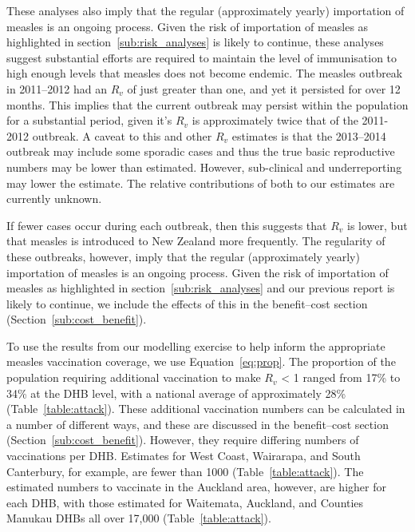 \documentclass{article}
\begin{document}
\begin{itemize}
These analyses also imply that the regular (approximately yearly) importation of measles is an ongoing process. Given the risk of importation of measles as highlighted in section~\ref{sub:risk_analyses} is likely to continue, these analyses suggest substantial efforts are required to maintain the level of immunisation to high enough levels that measles does not become endemic. The measles outbreak in 2011--2012 had an $R_v$ of just greater than one, and yet it persisted for over 12 months. This implies that the current outbreak may persist within the population for a substantial period, given it's $R_v$ is approximately twice that of the 2011-2012 outbreak. A caveat to this and other $R_v$ estimates is that the 2013--2014 outbreak may include some sporadic cases and thus the true basic reproductive numbers may be lower than estimated. However, sub-clinical and underreporting may lower the estimate. The relative contributions of both to our estimates are currently unknown. 

If fewer cases occur during each outbreak, then this suggests that $R_v$ is lower, but that measles is introduced to New Zealand more frequently. The regularity of these outbreaks, however, imply that the regular (approximately yearly) importation of measles is an ongoing process. Given the risk of importation of measles as highlighted in section~\ref{sub:risk_analyses} and our previous report is likely to continue, we include the effects of this in the benefit--cost section (Section~\ref{sub:cost_benefit}).

To use the results from our modelling exercise to help inform the appropriate measles vaccination coverage, we use Equation~\ref{eq:prop}. The proportion of the population requiring additional vaccination to make $R_v$ < 1 ranged from 17\% to 34\% at the DHB level, with a national average of approximately 28\% (Table~\ref{table:attack}). These additional vaccination numbers can be calculated in a number of different ways, and these are discussed in the benefit--cost section (Section~\ref{sub:cost_benefit}). However, they require differing numbers of vaccinations per DHB. Estimates for West Coast, Wairarapa, and South Canterbury, for example, are fewer than 1000 (Table~\ref{table:attack}). The estimated numbers to vaccinate in the Auckland area, however, are higher for each DHB, with those estimated for Waitemata, Auckland, and Counties Manukau DHBs all over 17,000  (Table~\ref{table:attack}).


\end{itemize}
\end{document}
